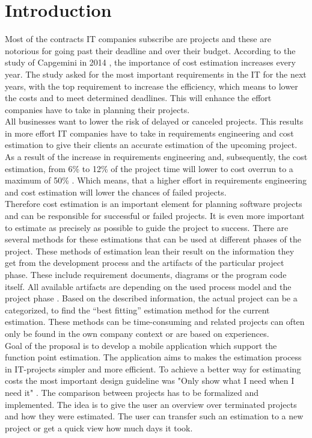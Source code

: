 \chapter{Introduction}

Most of the contracts IT companies subscribe are projects and these are notorious for going past their deadline and over their budget. According to the study of Capgemini in 2014 \cite{capgemini}, the importance of cost estimation increases every year. The study asked for the most important requirements in the IT for the next years, with the top requirement to increase the efficiency, which means to lower the costs and to meet determined deadlines. This will enhance the effort companies have to take in planning their projects.\\
All businesses want to lower the risk of delayed or canceled projects. This results in more effort IT companies have to take in requirements engineering and cost estimation to give their clients an accurate estimation of the upcoming project. As a result of the increase in requirements engineering and, subsequently, the cost estimation, from 6\% to 12\% of the project time will lower to cost overrun to a maximum of 50\% \cite{Partsch}. Which means, that a higher effort in requirements engineering and cost estimation will lower the chances of failed projects.\\
Therefore cost estimation is an important element for planning software projects and can be responsible for successful or failed projects. It is even more important to estimate as precisely as possible to guide the project to success. There are several methods for these estimations that can be used at different phases of the project. These methods of estimation lean their result on the information they get from the development process and the artifacts of the particular project phase. These include requirement documents, diagrams or the program code itself. All available artifacts are depending on the used process model and the project phase \cite{EntwicklungKompakt}. Based on the described information, the actual project can be  a categorized, to find the “best fitting” estimation method for the current estimation. These methods can be time-consuming and related projects can often only be found in the own company context or are based on experiences.\\
Goal of the proposal is to develop a mobile application which support the function point estimation. The application aims to makes the estimation process in IT-projects simpler and more efficient. To achieve a better way for estimating costs the most important design guideline was "Only show what I need when I need it" \cite{materialdesign}. The comparison between projects has to be formalized and implemented. The idea is to give the user an overview over terminated projects and how they were estimated. The user can transfer such an estimation to a new project or get a quick view how much days it took.\\
